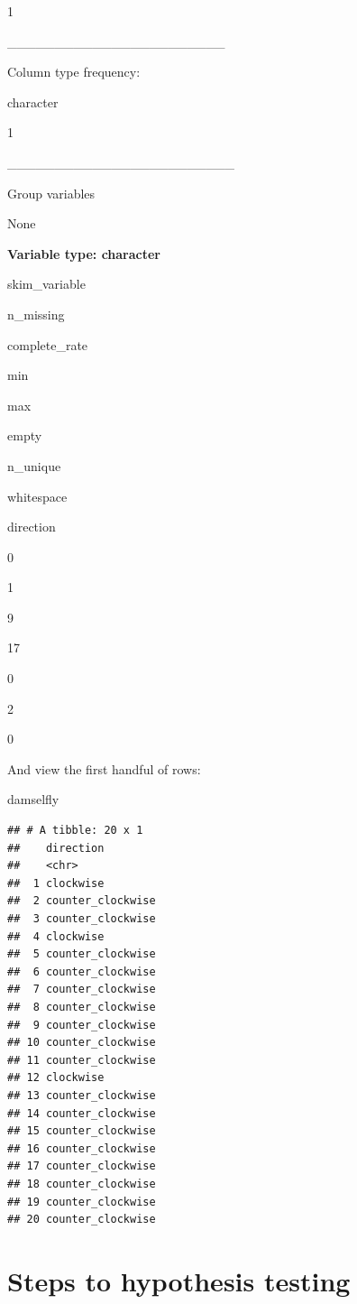 \documentclass[
]{book}
\newenvironment{Shaded}{\begin{snugshade}}{\end{snugshade}}
\newcommand{\NormalTok}[1]{#1}
\begin{document}
1

\_\_\_\_\_\_\_\_\_\_\_\_\_\_\_\_\_\_\_\_\_\_\_

Column type frequency:

character

1

\_\_\_\_\_\_\_\_\_\_\_\_\_\_\_\_\_\_\_\_\_\_\_\_

Group variables

None

\textbf{Variable type: character}

skim\_variable

n\_missing

complete\_rate

min

max

empty

n\_unique

whitespace

direction

0

1

9

17

0

2

0

And view the first handful of rows:

\begin{Shaded}
\begin{Highlighting}[]
\NormalTok{damselfly}
\end{Highlighting}
\end{Shaded}

\begin{verbatim}
## # A tibble: 20 x 1
##    direction        
##    <chr>            
##  1 clockwise        
##  2 counter_clockwise
##  3 counter_clockwise
##  4 clockwise        
##  5 counter_clockwise
##  6 counter_clockwise
##  7 counter_clockwise
##  8 counter_clockwise
##  9 counter_clockwise
## 10 counter_clockwise
## 11 counter_clockwise
## 12 clockwise        
## 13 counter_clockwise
## 14 counter_clockwise
## 15 counter_clockwise
## 16 counter_clockwise
## 17 counter_clockwise
## 18 counter_clockwise
## 19 counter_clockwise
## 20 counter_clockwise
\end{verbatim}

\section{Steps to hypothesis testing}\label{hyp_steps}
\end{document}
